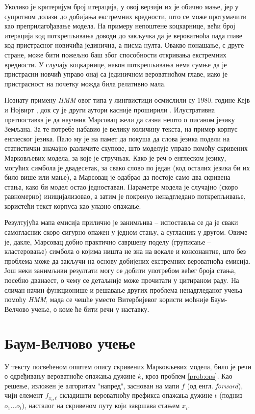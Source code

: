 \documentclass[12pt,oneside]{memoir}
\begin{document}
\begin{CJK}{UTF8}{ipxm}
Уколико је критеријум број итерација, у овој верзији их је обично мање, јер у супротном долази до добијања екстремних вредности, што се може протумачити као преприлагођавање модела. На примеру непоштене коцкарнице, већи број итерација код поткрепљивања доводи до закључка да је вероватноћа пада главе код пристрасног новичића јединична, а писма нулта. Овакво понашање, с друге стране, може бити пожељно баш због способности откривања екстремних вредности. У случају коцкарнице, након поткрепљивања нема сумње да је пристрасни новчић управо онај са јединичном вероватноћом главе, иако је пристрасност на почетку можда била релативно мала.

Познату примену \textit{HMM} овог типа у лингвистици осмислили су 1980. године Кејв и Нојвирт \cite{cave1980}, док су је други аутори касније проширили \cite{stamp2021}. Илустративна претпоставка је да научник Марсовац жели да сазна нешто о писаном језику Земљана. За те потребе набавио је велику количину текста, на пример корпус енглеског језика. Пало му је на памет да покуша да слова језика подели на статистички значајно различите скупове, што моделује управо помоћу скривених Марковљевих модела, за које је стручњак. Како је реч о енглеском језику, могућих симбола је двадесетак, за свако слово по један (код осталих језика би их било више или мање), а Марсовац је одабрао да постоје само два скривена стања, како би модел остао једноставан. Параметре модела је случајно (скоро равномерно) иницијализовао, а затим је покренуо ненадгледано поткрепљивање, користећи текст корпуса као улазно опажање.

Резултујућа мапа емисија прилично је занимљива -- испоставља се да је сваки самогласник скоро сигурно опажен у једном стању, а сугласник у другом. Овиме је, дакле, Марсовац добио практично савршену поделу (груписање -- кластеровање) симбола о којима ништа не зна на вокале и консонантне, што без проблема може да закључи на основу добијених екстремних вероватноћа емисија. Још неки занимљиви резултати могу се добити употребом већег броја стања, посебно дванаест, о чему се детаљније може прочитати у цитираном раду. На сличан начин функционише и решавање других проблема ненадгледаног учења помоћу \textit{HMM}, мада се чешће уместо Витербијевог користи моћније Баум-Велчово учење, о коме ће бити речи у наставку.

\section{Баум-Велчово учење}
У тексту посвећеном општем опису скривених Марковљевих модела, било је речи о одређивању вероватноће опажања дужине $k$, кроз проблем \ref{prob:ops}. Као решење, изложен је алгоритам "напред", заснован на мапи $f$ (од енгл. \textit{forward}), чији елемент $f_{x_i, t}$ складишти вероватноћу префикса опажања дужине $t$ (подниз $o_1...o_t$), насталог на скривеном путу који завршава стањем $x_i$.


\end{CJK}
\end{document}
